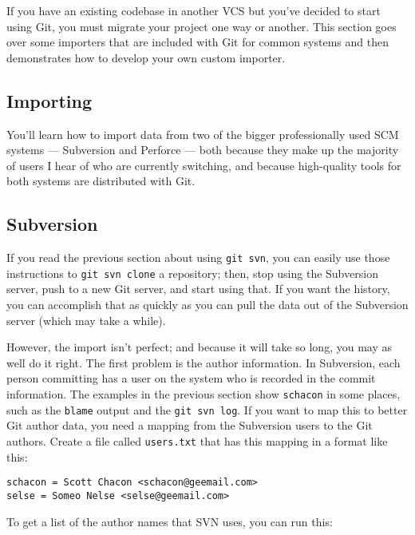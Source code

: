 \documentclass[a4paper]{book}
\begin{document}
If you have an existing codebase in another VCS but you've decided to start using Git, you must migrate your project one way or another. This section goes over some importers that are included with Git for common systems and then demonstrates how to develop your own custom importer.

\subsection{Importing}\label{importing}

You'll learn how to import data from two of the bigger professionally used SCM systems --- Subversion and Perforce --- both because they make up the majority of users I hear of who are currently switching, and because high-quality tools for both systems are distributed with Git.

\subsection{Subversion}\label{subversion}

If you read the previous section about using \texttt{git svn}, you can easily use those instructions to \texttt{git svn clone} a repository; then, stop using the Subversion server, push to a new Git server, and start using that. If you want the history, you can accomplish that as quickly as you can pull the data out of the Subversion server (which may take a while).

However, the import isn't perfect; and because it will take so long, you may as well do it right. The first problem is the author information. In Subversion, each person committing has a user on the system who is recorded in the commit information. The examples in the previous section show \texttt{schacon} in some places, such as the \texttt{blame} output and the \texttt{git svn log}. If you want to map this to better Git author data, you need a mapping from the Subversion users to the Git authors. Create a file called \texttt{users.txt} that has this mapping in a format like this:

\begin{shaded}\begin{verbatim}
schacon = Scott Chacon <schacon@geemail.com>
selse = Someo Nelse <selse@geemail.com>
\end{verbatim}\end{shaded}

To get a list of the author names that SVN uses, you can run this:
\end{document}
